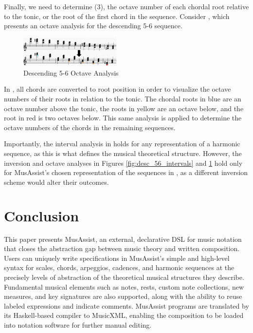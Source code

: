 \documentclass{article}
\begin{document}
Finally, we need to determine (3), the octave number of each chordal root relative to the tonic, or the root of the first chord in the sequence. Consider , which presents an octave analysis for the descending 5-6 sequence.

\vspace{-2mm}
\begin{figure}[h!]
\centering
\includegraphics[width=0.45\textwidth]{images/desc56-example}
  \caption{Descending 5-6 Octave Analysis}
  \label{fig:desc56-example}
\end{figure}
\vspace{-3mm}

In , all chords are converted to root position in order to visualize the octave numbers of their roots in relation to the tonic. The chordal roots in blue are an octave number above the tonic, the roots in yellow are an octave below, and the root in red is two octaves below. This same analysis is applied to determine the octave numbers of the chords in the remaining sequences.

Importantly, the interval analysis in  holds for any representation of a harmonic sequence, as this is what defines the musical theoretical structure. However, the inversion and octave analyses in Figures \ref{fig:desc_56_intervals} and \ref{fig:desc56-example} hold only for MusAssist’s chosen representation of the sequences in , as a different inversion scheme would alter their outcomes.


\section{Conclusion}
This paper presents MusAssist, an external, declarative DSL for music notation that closes the abstraction gap between music theory and written composition. Users can uniquely write specifications in MusAssist’s simple and high-level syntax for scales, chords, arpeggios, cadences, and harmonic sequences at the precisely levels of abstraction of the theoretical musical structures they describe. Fundamental musical elements such as notes, rests, custom note collections, new measures, and key signatures are also supported, along with the ability to reuse labeled expressions and indicate comments. MusAssist programs are translated by its Haskell-based compiler to MusicXML, enabling the composition to be loaded into notation software for further manual editing.
\end{document}
